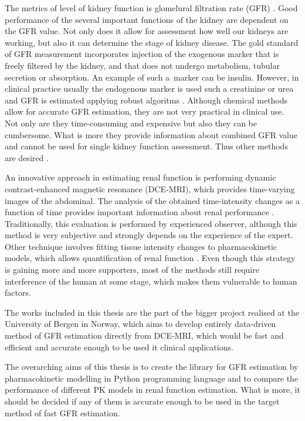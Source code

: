 The metrics of level of kidney function is glomelural filtration rate (GFR) \cite{traynor2006measure}. Good performance of the several important functions of the kidney are dependent on the GFR value. Not only does it allow for assessment how well our kidneys are working, but also it can determine the stage of kidney disease.
The gold standard of GFR measurement incorporates injection of the exogenous marker that is freely filtered by the kidney, and that does not undergo metabolism, tubular secretion or absorption. An example of such a~marker can be insulin.
However, in clinical practice usually the endogenous marker is used such a creatinine or urea and GFR is estimated applying robust algoritms \cite{delanaye2012measuring}.
Although chemical methods allow for accurate GFR estimation, they are not very practical in clinical use. Not only are they time-consuming and expensive but also they can be cumbersome. What is more they provide information about combined GFR value and cannot be used for single kidney function assessment. Thus other methods are desired \cite{bokacheva2008assessment}.

An innovative approach in estimating renal function is performing dynamic contrast-enhanced magnetic resonance (DCE-MRI), which provides time-varying images of the abdominal.
The analysis of the obtained time-intensity changes as a function of time provides important information about renal performance \cite{bokacheva2008assessment, khalifa2014models}. Traditionally, this evaluation is performed by experienced observer, although this method is very subjective and strongly depends on the experience of the expert. Other technique involves fitting tissue intensity changes to pharmacokinetic models, which allows quantification of renal function \cite{khalifa2014models}. Even though this strategy is gaining more and more supporters, most of the methods still require interference of the human at some stage, which makes them vulnerable to human factors. 

The works included in this thesis are the part of the bigger project realised at the University of Bergen in Norway, which aims to develop entirely data-driven method of GFR estimation directly from DCE-MRI, which would be fast and efficient and accurate enough to be used it clinical applications.  
 
The overarching aims of this thesis is to create the library for GFR estimation by pharmacokinetic modelling in Python programming language and to compare the performance of different PK models in renal function estimation. What is more, it should be decided if any of them is accurate enough to be used in the target method of fast GFR estimation. 

